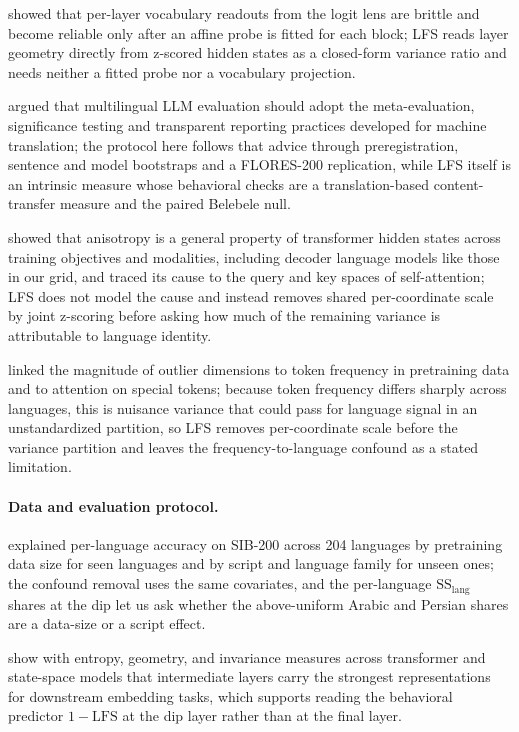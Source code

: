 \documentclass{article} %
\begin{document}
\citet{belrose2023tuned} showed that per-layer vocabulary readouts from the logit lens are brittle and become reliable only after an affine probe is fitted for each block; LFS reads layer geometry directly from z-scored hidden states as a closed-form variance ratio and needs neither a fitted probe nor a vocabulary projection.

\citet{kreutzer2025dejavu} argued that multilingual LLM evaluation should adopt the meta-evaluation, significance testing and transparent reporting practices developed for machine translation; the protocol here follows that advice through preregistration, sentence and model bootstraps and a FLORES-200 replication, while LFS itself is an intrinsic measure whose behavioral checks are a translation-based content-transfer measure and the paired Belebele null.

\citet{godey2024anisotropy} showed that anisotropy is a general property of transformer hidden states across training objectives and modalities, including decoder language models like those in our grid, and traced its cause to the query and key spaces of self-attention; LFS does not model the cause and instead removes shared per-coordinate scale by joint z-scoring before asking how much of the remaining variance is attributable to language identity.

\citet{puccetti2022outlier} linked the magnitude of outlier dimensions to token frequency in pretraining data and to attention on special tokens; because token frequency differs sharply across languages, this is nuisance variance that could pass for language signal in an unstandardized partition, so LFS removes per-coordinate scale before the variance partition and leaves the frequency-to-language confound as a stated limitation.

\paragraph{Data and evaluation protocol.}
\citet{bagherinezhad2024drives} explained per-language accuracy on SIB-200 across 204 languages by pretraining data size for seen languages and by script and language family for unseen ones; the confound removal uses the same covariates, and the per-language $\mathrm{SS}_{\mathrm{lang}}$ shares at the dip let us ask whether the above-uniform Arabic and Persian shares are a data-size or a script effect.

\citet{skean2025layer} show with entropy, geometry, and invariance measures across transformer and state-space models that intermediate layers carry the strongest representations for downstream embedding tasks, which supports reading the behavioral predictor $1-\mathrm{LFS}$ at the dip layer rather than at the final layer.
\end{document}

